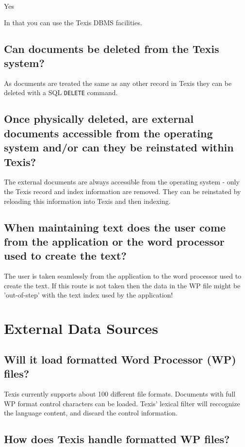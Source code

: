 Yes

In that you can use the Texis DBMS facilities.

\subsection{Can documents be deleted from the Texis system?}

As documents are treated the same as any other record in Texis they can
be deleted with a SQL \verb`DELETE` command.

\subsection{Once physically deleted, are external documents accessible from the
operating system and/or can they be reinstated within Texis?}

The external documents are always accessible from the operating system -
only the Texis record and index information are removed.  They can be
reinstated by reloading this information into Texis and then indexing.

\subsection{When maintaining text does the user come from the application or the
word processor used to create the text?}

The user is taken seamlessly from the application to the word processor
used to create the text.  If this route is not taken then the data in the
WP file might be 'out-of-step' with the text index used by the
application!

\section{External Data Sources}

\subsection{Will it load formatted Word Processor (WP) files?}

Texis currently supports about 100 different file formats.
Documents with full WP format control characters can be loaded. Texis'
lexical filter will reccognize the language content, and discard the
control information.

\subsection{How does Texis handle formatted WP files?}

